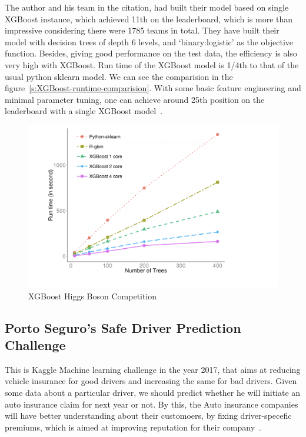 The author and his team in the citation, had built their model based on single
XGBoost instance, which achieved 11th on the leaderboard, which is more than
impressive considering there were 1785 teams in total. They have built their
model with decision trees of depth 6 levels, and `binary:logistic' as the
objective function. Besides, giving good performance on the test data, the
efficiency is also very high with XGBoost. Run time of the XGBoost model is
1/4th to that of the usual python sklearn model. We can see the comparision in
the figure~\ref{s:XGBoost-runtime-comparision}. With some basic feature
engineering and minimal parameter tuning, one can achieve around 25th position
on the leaderboard with a single XGBoost model~\cite{hid-sp18-401-XGBoost-pdf}.

\begin{figure}[!ht]
        \centering\includegraphics[width=\columnwidth]
        {images/Runtime-vs-Number-of-trees.png}
        \caption{XGBoost Higgs Boson Competition}\label{fig:XGBoost-runtime-comparision}
\end{figure}

\subsection{Porto Seguro's Safe Driver Prediction Challenge} 

This is Kaggle Machine learning challenge in the year 2017, that aims at
reducing vehicle insurance for good drivers and increasing the same for bad
drivers. Given some data about a particular driver, we should predict whether
he will initiate an auto insurance claim for next year or not. By this, the
Auto insurance companies  will have better understanding about their
customoers, by fixing driver-specefic premiums, which is aimed at improving
reputation for their company~\cite{hid-sp18-401-Kaggle-Porto-Seguro}.


